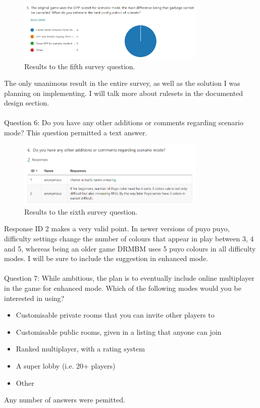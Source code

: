 \documentclass{report}
\begin{document}
\begin{figure}[ht]
    \centering
    \includegraphics[width=0.8\textwidth]{survey5.png}
    \caption{\label{fig:survey5}Results to the fifth survey question.}
\end{figure}

The only unanimous result in the entire survey, as well as the solution I was planning on implementing. I will talk more about rulesets in the documented design section.
\\\\
Question 6: Do you have any other additions or comments regarding scenario mode?
This question permitted a text answer.

\begin{figure}[ht]
    \centering
    \includegraphics[width=0.8\textwidth]{survey6.png}
    \caption{\label{fig:survey6}Results to the sixth survey question.}
\end{figure}

Response ID 2 makes a very valid point. In newer versions of puyo puyo, difficulty settings change the number of colours that appear in play between 3, 4 and 5, whereas being an older game DRMBM uses 5 puyo colours in all difficulty modes. I will be sure to include the suggestion in enhanced mode.
\\\\
Question 7: While ambitious, the plan is to eventually include online multiplayer in the game for enhanced mode. Which of the following modes would you be interested in using? 
\begin{itemize}
    \renewcommand\labelitemi{--}
    \item Customisable private rooms that you can invite other players to
    \item Customisable public rooms, given in a listing that anyone can join
    \item Ranked multiplayer, with a rating system
    \item A super lobby (i.e. 20+ players)
    \item Other
\end{itemize}
Any number of answers were pemitted.
\end{document}
